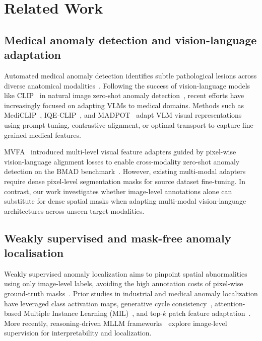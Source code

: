 \documentclass[10pt,twocolumn,letterpaper]{article}
\begin{document}
\section{Related Work}
\label{sec:related}

\subsection{Medical anomaly detection and vision-language adaptation}
Automated medical anomaly detection identifies subtle pathological lesions across diverse anatomical modalities~\cite{medicalad_survey2021, bmad2024}. Following the success of vision-language models like CLIP~\cite{clip2021} in natural image zero-shot anomaly detection~\cite{winclip2023, aprilgan2023, anomalyclip2023, adaclip2024, vcpclip2024}, recent efforts have increasingly focused on adapting VLMs to medical domains. Methods such as MediCLIP~\cite{mediclip2024}, IQE-CLIP~\cite{iqeclip2026}, and MADPOT~\cite{madpot2026} adapt VLM visual representations using prompt tuning, contrastive alignment, or optimal transport to capture fine-grained medical features.

MVFA~\cite{huang2024mvfa} introduced multi-level visual feature adapters guided by pixel-wise vision-language alignment losses to enable cross-modality zero-shot anomaly detection on the BMAD benchmark~\cite{bmad2024}. However, existing multi-modal adapters require dense pixel-level segmentation masks for source dataset fine-tuning. In contrast, our work investigates whether image-level annotations alone can substitute for dense spatial masks when adapting multi-modal vision-language architectures across unseen target modalities.

\subsection{Weakly supervised and mask-free anomaly localisation}
Weakly supervised anomaly localization aims to pinpoint spatial abnormalities using only image-level labels, avoiding the high annotation costs of pixel-wise ground-truth masks~\cite{mvtec2019, cycle_seg2021}. Prior studies in industrial and medical anomaly localization have leveraged class activation maps, generative cycle consistency~\cite{cycle_seg2021}, attention-based Multiple Instance Learning (MIL)~\cite{ilse2018attentionmil}, and top-$k$ patch feature adaptation~\cite{adfa2023}. More recently, reasoning-driven MLLM frameworks~\cite{imagelevel2026} explore image-level supervision for interpretability and localization.
\end{document}
